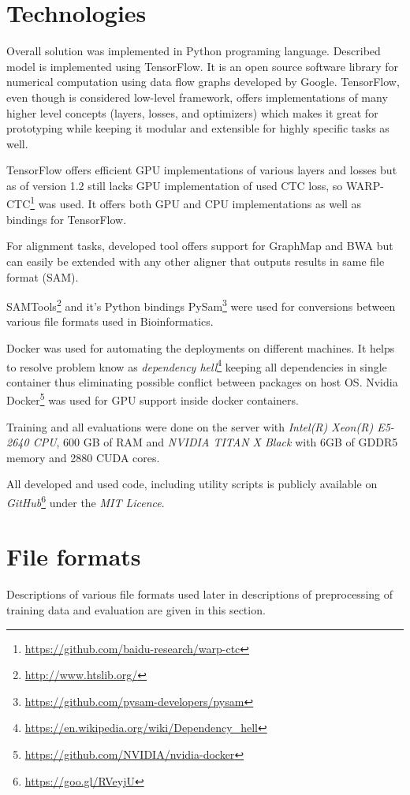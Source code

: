 \documentclass[times, utf8, diplomski, numeric, english]{fer}
\begin{document}
\section{Technologies}
\label{sec:tech}
Overall solution was implemented in Python programing language. Described model is implemented using TensorFlow. It is an open source software library for numerical computation using data flow graphs developed by Google. TensorFlow, even though is considered low-level framework, offers implementations of many higher level concepts (layers, losses, and optimizers) which makes it great for prototyping while keeping it modular and extensible for highly specific tasks as well.

TensorFlow offers efficient GPU implementations of various layers and losses but as of version 1.2 still lacks GPU implementation of used CTC loss, so WARP-CTC\footnote{\url{https://github.com/baidu-research/warp-ctc}} was used. It offers both GPU and CPU implementations as well as bindings for TensorFlow.

For alignment tasks, developed tool offers support for GraphMap and BWA but can easily be extended with any other aligner that outputs results in same file format (SAM).

SAMTools\footnote{\url{http://www.htslib.org/}} and it's Python bindings PySam\footnote{\url{https://github.com/pysam-developers/pysam}} were used for conversions between various file formats used in Bioinformatics.

Docker was used for automating the deployments on different machines. It helps to resolve problem know as \textit{dependency hell}\footnote{\url{https://en.wikipedia.org/wiki/Dependency_hell}}  keeping all dependencies in single container thus eliminating possible conflict between packages on host OS.
Nvidia Docker\footnote{\url{https://github.com/NVIDIA/nvidia-docker}} was used for GPU support inside docker containers.


Training and all evaluations were done on the server with  \textit{Intel(R) Xeon(R) E5-2640 CPU}, 600 GB of RAM and \textit{NVIDIA TITAN X Black} with 6GB of GDDR5 memory and 2880 CUDA cores.

All developed and used code, including utility scripts is publicly available on \textit{GitHub}\footnote{\url{https://goo.gl/RVeyjU}} under the \textit{MIT Licence}.

\section{File formats}
Descriptions of various file formats used later in descriptions of preprocessing of training data and evaluation are given in this section.
\end{document}

